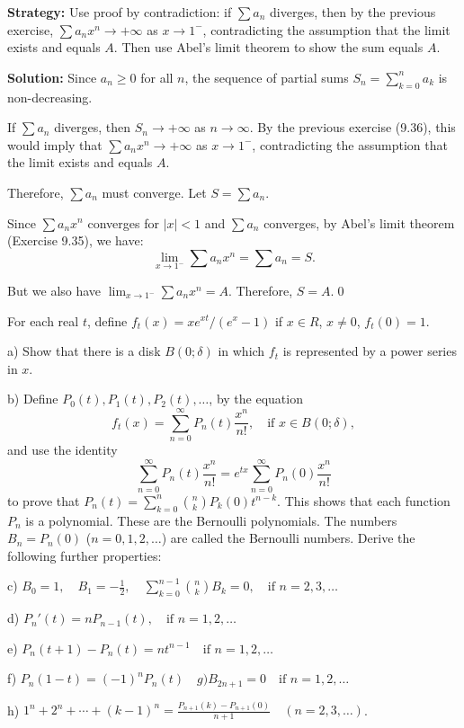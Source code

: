 \noindent\textbf{Strategy:} Use proof by contradiction: if \( \sum a_n \) diverges, then by the previous exercise, \( \sum a_n x^n \to +\infty \) as \( x \to 1^- \), contradicting the assumption that the limit exists and equals \( A \). Then use Abel's limit theorem to show the sum equals \( A \).

\bigskip\noindent\textbf{Solution:} Since \( a_n \geq 0 \) for all \( n \), the sequence of partial sums \( S_n = \sum_{k=0}^n a_k \) is non-decreasing.

If \( \sum a_n \) diverges, then \( S_n \to +\infty \) as \( n \to \infty \). By the previous exercise (9.36), this would imply that \( \sum a_n x^n \to +\infty \) as \( x \to 1^- \), contradicting the assumption that the limit exists and equals \( A \).

Therefore, \( \sum a_n \) must converge. Let \( S = \sum a_n \).

Since \( \sum a_n x^n \) converges for \( |x| < 1 \) and \( \sum a_n \) converges, by Abel's limit theorem (Exercise 9.35), we have:
\[\lim_{x \to 1^-} \sum a_n x^n = \sum a_n = S.\]

But we also have \( \lim_{x \to 1^-} \sum a_n x^n = A \). Therefore, \( S = A \).\qed


\begin{problembox}
\begin{problemstatement}
For each real \( t \), define \( f_t(x) = xe^{xt}/(e^x - 1) \) if \( x \in R \), \( x \neq 0 \), \( f_t(0) = 1 \).

a) Show that there is a disk \( B(0; \delta) \) in which \( f_t \) is represented by a power series in \( x \).

b) Define \( P_0(t), P_1(t), P_2(t), \ldots \), by the equation
\[f_t(x) = \sum_{n=0}^\infty P_n(t) \frac{x^n}{n!}, \quad \text{if } x \in B(0; \delta),\]
and use the identity
\[\sum_{n=0}^\infty P_n(t) \frac{x^n}{n!} = e^{tx} \sum_{n=0}^\infty P_n(0) \frac{x^n}{n!}\]
to prove that \( P_n(t) = \sum_{k=0}^n \binom{n}{k} P_k(0)t^{n-k} \). This shows that each function \( P_n \) is a polynomial. These are the Bernoulli polynomials. The numbers \( B_n = P_n(0) \) (\( n = 0, 1, 2, \ldots \)) are called the Bernoulli numbers. Derive the following further properties:

c) \( B_0 = 1, \quad B_1 = -\frac{1}{2}, \quad \sum_{k=0}^{n-1} \binom{n}{k} B_k = 0, \quad \text{if } n = 2, 3, \ldots \)

d) \( P_n'(t) = nP_{n-1}(t), \quad \text{if } n = 1, 2, \ldots \)

e) \( P_n(t + 1) - P_n(t) = nt^{n-1} \quad \text{if } n = 1, 2, \ldots \)

f) \( P_n(1 - t) = (-1)^n P_n(t) \quad g) B_{2n+1} = 0 \quad \text{if } n = 1, 2, \ldots \)

h) \( 1^n + 2^n + \cdots + (k - 1)^n = \frac{P_{n+1}(k) - P_{n+1}(0)}{n + 1} \quad (n = 2, 3, \ldots ) \).
\end{problemstatement}
\end{problembox}

